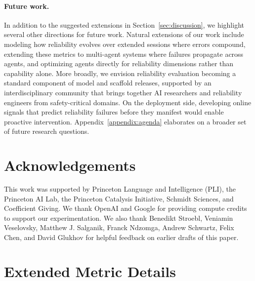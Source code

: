\documentclass[11pt]{article}
\newcounter{dimension}
\begin{document}
\paragraph{Future work.} In addition to the suggested extensions in Section~\ref{sec:discussion}, we highlight several other directions for future work. Natural extensions of our work include modeling how reliability evolves over extended sessions where errors compound, extending these metrics to multi-agent systems where failures propagate across agents, and optimizing agents directly for reliability dimensions rather than capability alone.
More broadly, we envision reliability evaluation becoming a standard component of model and scaffold releases, supported by an interdisciplinary community that brings together AI researchers and reliability engineers from safety-critical domains.
On the deployment side, developing online signals that predict reliability failures before they manifest would enable proactive intervention.
Appendix~\ref{appendix:agenda} elaborates on a broader set of future research questions.


\section*{Acknowledgements}
This work was supported by Princeton Language and Intelligence (PLI), the Princeton AI Lab, the Princeton Catalysis Initiative, Schmidt Sciences, and Coefficient Giving. We thank OpenAI and Google for providing compute credits to support our experimentation. We also thank Benedikt Stroebl, Veniamin Veselovsky, Matthew J. Salganik, Franck Ndzomga, Andrew Schwartz, Felix Chen, and David Glukhov for helpful feedback on earlier drafts of this paper. 




\newpage
\appendix
\onecolumn

\section{Extended Metric Details}
\label{appendix:metrics}
\end{document}
